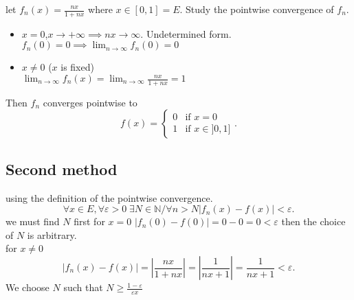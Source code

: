 \begin{example}
    let $f_n(x)=\frac{nx}{1+nx}$ where $x\in[0,1]=E$. Study the pointwise convergence of $f_n$.
    \begin{itemize}
        \item $x=0$,$x \to +\infty\implies nx\to \infty$. Undetermined form.\\
            $f_n(0)=0\implies\lim_{n \to \infty}f_n(0)=0 $
        \item $x \neq 0$ ($x$ is fixed)\\
            $\lim_{n \to \infty} f_n(x)=\lim_{n \to \infty}\frac{nx}{1+nx}=1 $
    \end{itemize}
    Then $f_n$ converges pointwise to 
    \[
    f(x)=\begin{cases}
        0&\text{if }x=0\\
        1&\text{if }x\in]0,1]
    \end{cases}
    .\] 
\end{example}
\subsection{Second method}
using the definition of the pointwise convergence.
\[
\forall x \in E,\forall \varepsilon>0\; \exists N\in \mathbb{N}/\forall n>N \left|f_n(x)-f(x)\right|<\varepsilon
.\] 
we must find $N$ first for $x=0$ $\left|f_n(0)-f(0)\right|=0-0=0<\varepsilon$ then the choice of $N$ is arbitrary.\\
for $x\neq 0$ \\
\[
\left|f_n(x)-f(x)\right|=\left|\frac{nx}{1+nx}\right|=\left|\frac{1}{nx+1}\right|=\frac{1}{nx+1}<\varepsilon
.\] 
We choose $N$ such that $N\ge \frac{1-\varepsilon}{\varepsilon x}$
